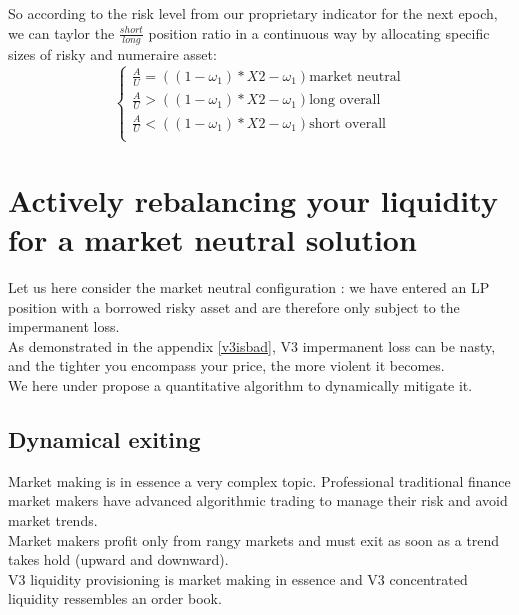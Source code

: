 \documentclass[conference]{IEEEtran}
\begin{document}
So according to the risk level from our proprietary indicator for the next epoch, we can taylor the $\frac{short}{long}$ position ratio in a continuous way by allocating specific sizes of risky and numeraire asset:\\
\begin{equation}
\left\{
\begin{array}{lll}
\frac{A}{U} = \left((1-\omega_1)*X2-\omega_1 \right)\text{market neutral} \\
\frac{A}{U} > \left((1-\omega_1)*X2-\omega_1 \right) \text{long overall} \\
\frac{A}{U} < \left((1-\omega_1)*X2-\omega_1 \right)\text{short overall}  \\
\end{array}
\end{equation}
\section{Actively rebalancing your liquidity for a market neutral solution}
Let us here consider the market neutral configuration : we have entered an LP position with a borrowed risky asset and are therefore only subject to the impermanent loss.\\
As demonstrated in the appendix \ref{v3isbad}, V3 impermanent loss can be nasty, and the tighter you encompass your price, the more violent it becomes.\\
We here under propose a quantitative algorithm to dynamically mitigate it.\\
\subsection{Dynamical exiting}
Market making is in essence a very complex topic. Professional traditional finance market makers have advanced algorithmic trading to manage their risk and avoid market trends.\\
Market makers profit only from rangy markets and must exit as soon as a trend takes hold (upward and downward).\\
V3 liquidity provisioning is market making in essence and V3 concentrated liquidity ressembles an order book.\\ 
\end{document}
